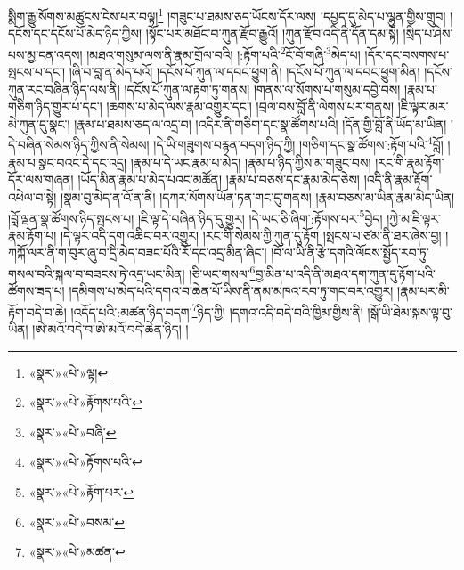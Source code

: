སྨིག་རྒྱུ་སོགས་མཚུངས་ངེས་པར་བལྟ།\footnote{«སྣར་»«པེ་»ལྟ།} །གཟུང་པ་ཐམས་ཅད་ཡོངས་དོར་ལས། །དཔྱད་དུ་མེད་པ་ལྷུན་གྱིས་གྲུབ། །དངོས་དང་དངོས་པོ་མེད་ཉིད་ཀྱིས། །སྟོང་པར་མཐོང་བ་ཀུན་རྫོབ་རྒྱུའོ། །ཀུན་རྫོབ་འདི་ནི་དོན་དམ་སྟེ། །སྲིད་པ་ཤེས་པས་མྱ་ངན་འདས། །མཐའ་གསུམ་ལས་ནི་རྣམ་གྲོལ་བའི། །:རྟོག་པའི་\footnote{«སྣར་»«པེ་»རྟོགས་པའི་}ངོ་བོ་གཞི་\footnote{«སྣར་»«པེ་»བཞི་}མེད་པ། །དོར་དང་བསགས་པ་སྤངས་པ་དང་། །ཞི་བ་བླ་ན་མེད་པའོ། །དངོས་པོ་ཀུན་ལ་དབང་ཕྱུག་ནི། །དངོས་པོ་ཀུན་ལ་དབང་ཕྱུག་མིན། །དངོས་ཀུན་རང་བཞིན་ཉིད་ལས་ནི། །དངོས་པོ་ཀུན་ལ་རྟག་ཏུ་གནས། །གནས་ལ་སོགས་པ་གསུམ་དབྱེ་བས། །རྣམ་པ་གཅིག་ཉིད་གྱུར་པ་དང་། །ཆགས་པ་མེད་ལས་རྣམ་འགྱུར་དང་། །བྲལ་བས་བློ་ནི་ལེགས་པར་གནས། །ཇི་ལྟར་མར་མེ་ཀུན་དུ་སྣང་། །རྣམ་པ་ཐམས་ཅད་ལ་འདྲ་བ། །འདིར་ནི་གཅིག་དང་སྣ་ཚོགས་པའི། །དོན་གྱི་བློ་ནི་ཡོད་མ་ཡིན། །དེ་བཞིན་སེམས་ཉིད་ཀྱིས་ནི་སེམས། །དེ་ཡི་གཟུགས་བརྙན་བདག་ཉིད་ཀྱི། །གཅིག་དང་སྣ་ཚོགས་:རྟོག་པའི་\footnote{«སྣར་»«པེ་»རྟོགས་པའི་}བློ། །རྣམ་པ་སྣང་བའང་དེ་དང་འདྲ། །རྣམ་པ་དེ་ཡང་རྣམ་པ་མེད། །རྣམ་པ་ཉིད་ཀྱིས་མ་གཟུང་བས། །རང་གི་རྣམ་རྟོག་དོར་ལས་གཞན། །ཡོད་མིན་རྣམ་པ་མེད་པའང་མཚོན། །རྣམ་པ་བཅས་དང་རྣམ་མེད་ཅེས། །འདི་ནི་རྣམ་རྟོག་འཕེལ་བ་སྟེ། །སྣམ་བུ་མེད་ན་འོ་ན་ནི། །དཀར་སོགས་ཡོན་ཏན་གང་དུ་གནས། །རྣམ་བཅས་མ་ཡིན་རྣམ་མེད་ཡིན། །བློ་ལྡན་སྣ་ཚོགས་ཉིད་སྤངས་པ། །ཇི་ལྟ་དེ་བཞིན་ཉིད་དུ་གྱུར། །དེ་ཡང་ཅི་ཞིག་:རྟོགས་པར་\footnote{«སྣར་»«པེ་»རྟོག་པར་}བྱེད། །ཀྱེ་མ་ཇི་ལྟར་རྣམ་རྟོག་པ། །དེ་ལྟར་འདི་དག་འཆིང་བར་འགྱུར། །རང་གི་སེམས་ཀྱི་ཀུན་དུ་རྟོག །སྤངས་པ་ཙམ་ནི་ཐར་ཞེས་བྱ། །ཀཀྐོ་ལར་ནི་ག་བུར་ཞུ་བ་དྲི་མེད་བཟང་པོའི་རོ་དང་འདྲ་མིན་ཞིང་། །བོ་ལ་ཡི་ནི་རྩེ་དགའི་ལོངས་སྤྱོད་རབ་ཏུ་གསལ་བའི་སྐལ་བ་བཟངས་ཏེ་འདྲ་ཡང་མིན། །ཅི་ཡང་གསལ་\footnote{«སྣར་»«པེ་»བསམ་}བྱ་མིན་པ་འདི་ནི་མཐའ་དག་ཀུན་དུ་རྟོག་པའི་ཚོགས་ཟད་པ། །དམིགས་པ་མེད་པའི་དགའ་བ་ཆེན་པོ་ཡིས་ནི་ནམ་མཁའ་རབ་ཏུ་གང་བར་འགྱུར། །རྣམ་པར་མི་རྟོག་བདེ་བ་ཆེ། །འདོད་པའི་:མཚན་ཉིད་བདག་\footnote{«སྣར་»«པེ་»མཚན་}ཉིད་ཀྱི། །དགའ་འདི་བདེ་བའི་ཁྱིམ་གྱིས་ནི། །སྒོ་ཡི་ཐེམ་སྐས་ལྟ་བུ་ཡིན། །ཨེ་མའོ་བདེ་བ་ཨེ་མའོ་བདེ་ཆེན་ཉིད། །
